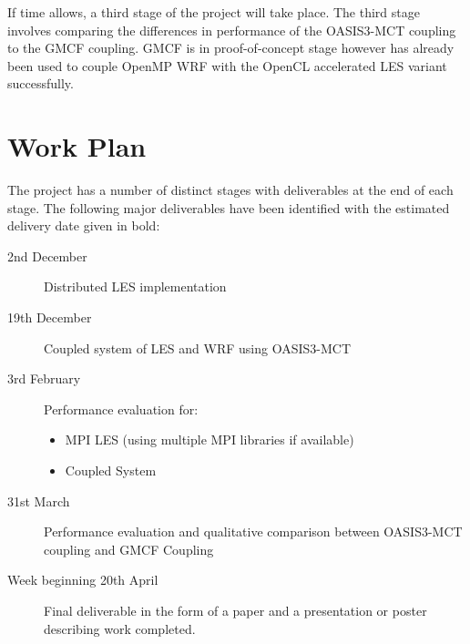 \documentclass{acm_proc_article-sp}
\begin{document}
If time allows, a third stage of the project will take place. The third stage
involves comparing the differences in performance of the OASIS3-MCT coupling to
the GMCF coupling. GMCF is in proof-of-concept stage however has already been
used to couple OpenMP WRF with the OpenCL accelerated LES variant successfully.

\section*{Work Plan}

The project has a number of distinct stages with deliverables at the end of each
stage. The following major deliverables have been identified with the estimated
delivery date given in bold:

\begin{description}
	\item[2nd December] Distributed LES implementation
	\item[19th December] Coupled system of LES and WRF using OASIS3-MCT
	\item[3rd February] Performance evaluation for:
    \begin{itemize}
        \item MPI LES (using multiple MPI libraries if available)
        \item Coupled System
    \end{itemize}
	\item[31st March] Performance evaluation and qualitative comparison between
    OASIS3-MCT coupling and GMCF Coupling
    \item[Week beginning 20th April] Final deliverable in the form of a paper
    and a presentation or poster describing work completed.
\end{description}



\end{document}
